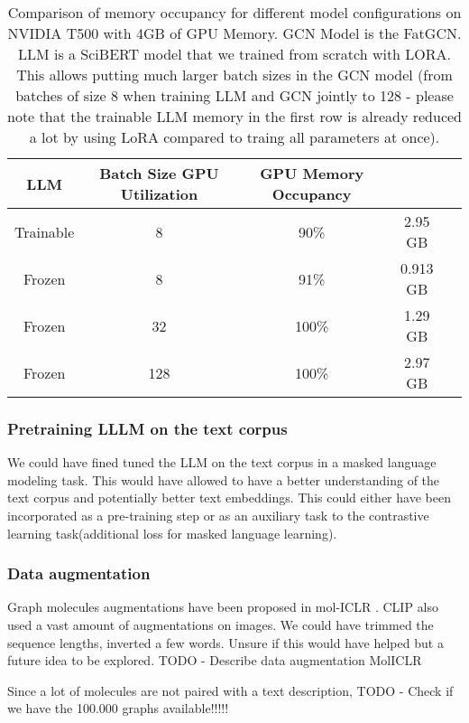 \begin{table*}[ht]
    \centering
    \begin{tabular}{ccccc}
    \hline
    \textbf{LLM} & \textbf{Batch Size} \textbf{GPU Utilization}& \textbf{GPU Memory Occupancy} \\ \hline
    Trainable & 8 & 90\% & 2.95 GB \\
    Frozen & 8 & 91\% & 0.913 GB \\
    Frozen & 32 & 100\% & 1.29 GB \\
    Frozen & 128 & 100\% & 2.97 GB \\
    \hline
    \end{tabular}
    \caption{Comparison of memory occupancy for different model configurations on NVIDIA T500 with 4GB of GPU Memory. GCN Model is the FatGCN. LLM is a SciBERT model that we trained from scratch with LORA. This allows putting much larger batch sizes in the GCN model (from batches of size 8 when training LLM and GCN jointly to 128 - please note that the trainable LLM memory in the first row is already reduced a lot by using LoRA compared to traing all parameters at once).}
    \label{table:ft_gcn_model_memory_occupancy}
\end{table*}

\subsubsection*{Pretraining LLLM on the text corpus}
We could have fined tuned the LLM on the text corpus in a masked language modeling task. This would have allowed to have a better understanding of the text corpus and potentially better text embeddings. This could either have been incorporated as a pre-training step or as an auxiliary task to the contrastive learning task(additional loss for masked language learning).

\subsubsection*{Data augmentation}
Graph molecules augmentations have been proposed in mol-ICLR \cite{molICLR}. CLIP \cite{CLIP} also used a vast amount of augmentations on images. We could have trimmed the sequence lengths, inverted a few words. Unsure if this would have helped but a future idea to be explored.
\color{red}TODO - Describe data augmentation MolICLR\color{black}

Since a lot of molecules are not paired with a text description, 
\color{red}TODO - Check if we have the 100.000 graphs available!!!!!\color{black}